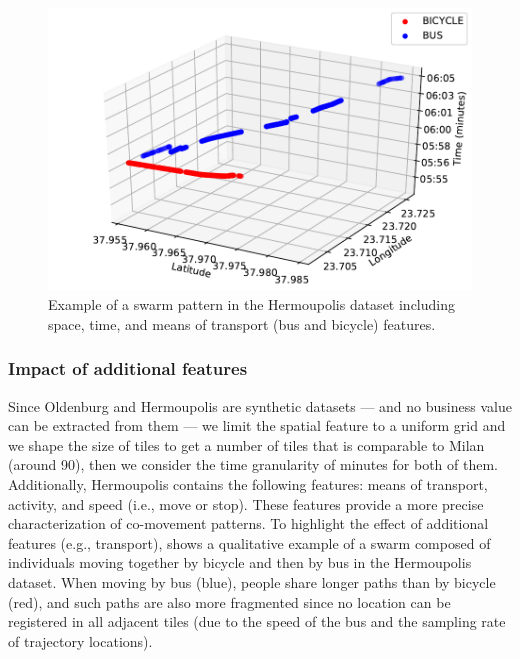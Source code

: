\documentclass[preprint,12pt,authoryear]{elsarticle} %
\renewcommand{\sf}[1]{\textsf{\textup{#1}}}
\begin{document}
\begin{figure}[t]
    \centering
    \includegraphics[scale=.55]{hermoupolis.pdf}
    \caption{Example of a swarm pattern in the \sf{Hermoupolis} dataset including space, time, and means of transport (bus and bicycle) features.}
    \label{fig:hermoupolis}
\end{figure}

\subsubsection{Impact of additional features}
Since \sf{Oldenburg} and \sf{Hermoupolis} are synthetic datasets --- and no business value can be extracted from them --- we limit the spatial feature to a uniform grid and we shape the size of tiles to get a number of tiles that is comparable to \sf{Milan} (around 90), then we consider the time granularity of minutes for both of them.
Additionally, \sf{Hermoupolis} contains the following features: means of transport, activity, and speed (i.e., move or stop).
These features provide a more precise characterization of co-movement patterns.
To highlight the effect of additional features (e.g., transport),  shows a qualitative example of a swarm composed of individuals moving together by bicycle and then by bus in the \sf{Hermoupolis} dataset.
When moving by bus (blue), people share longer paths than by bicycle (red), and such paths are also more fragmented since no location can be registered in all adjacent tiles (due to the speed of the bus and the sampling rate of trajectory locations). 
\end{document}
